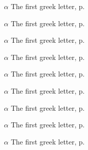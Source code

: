 \begin{eqlist}
\item[$\alpha$]
The first greek letter, p.~\pageref{ChX-figure: FigureLabel7}

\item[$\alpha$]
The first greek letter, p.~\pageref{ChX-figure: FigureLabel8}

\item[$\alpha$]
The first greek letter, p.~\pageref{ChX-figure: FigureLabel3}

\item[$\alpha$]
The first greek letter, p.~\pageref{ChX-figure: FigureLabel3}

\item[$\alpha$]
The first greek letter, p.~\pageref{ChX-figure: FigureLabel3}

\item[$\alpha$]
The first greek letter, p.~\pageref{ChX-figure: FigureLabel3}

\item[$\alpha$]
The first greek letter, p.~\pageref{ChX-figure: FigureLabel3}

\item[$\alpha$]
The first greek letter, p.~\pageref{ChX-figure: FigureLabel3}

\item[$\alpha$]
The first greek letter, p.~\pageref{ChX-figure: FigureLabel3}

\end{eqlist}